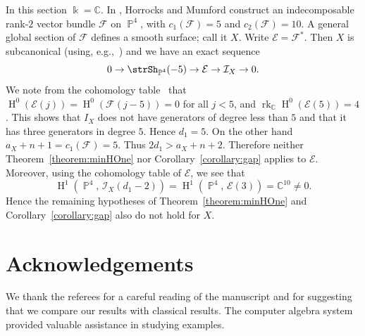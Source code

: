 \documentclass[11pt,a4paper]{amsart}
\theoremstyle{plain}
\theoremstyle{definition}
\newcommand{\calE}{\mathcal E}
\newcommand{\calF}{\mathcal F}
\newcommand{\calI}{\mathcal I}
\newcommand{\complex}{\mathbb{C}}
\DeclareMathOperator{\rank}{rk}
\DeclareMathOperator{\projective}{\mathbb{P}}
\DeclareMathOperator{\homology}{H}
\begin{document}
In this section $\Bbbk = \complex$.
In \cite{HorrocksMumfordRank21973}, Horrocks and Mumford construct an
indecomposable rank-$2$ vector bundle $\calF$ on $\projective^4$, 
with $c_1(\calF) = 5$ and $c_2(\calF) = 10$. A general global section of
$\calF$ defines a smooth surface; call it $X$. Write $\calE = \calF^*$.
Then $X$ is subcanonical (using, e.g.,~\cite[Proposition
6.1]{HartshorneVarSmallCodim1974})
and we have an exact sequence
\[
0 \to \strSh_{\projective^4}(-5) \to \calE \to \calI_X \to 0. 
\]
We note from the cohomology table~\cite[p.~74]{HorrocksMumfordRank21973}
that $\homology^0(\calE(j)) = \homology^0(\calF(j-5)) = 0$ for all $j < 5$, and
$\rank_\complex \homology^0(\calE(5)) = 4$. 
This shows that $I_X$ does not have generators of degree less than $5$ and
that it has three generators in degree $5$.
Hence $d_1 = 5$. On the other hand $a_X + n+1  = c_1(\calF) = 5$. Thus 
$2d_1 > a_X + n+2$. Therefore neither Theorem~\ref{theorem:minHOne} nor
Corollary~\ref{corollary:gap} applies to $\calE$.
Moreover, using the cohomology table of $\calE$, we see that
\[
\homology^1(\projective^4,\, \calI_X(d_1 - 2)) = 
\homology^1(\projective^4,\, \calE(3)) = \complex^{10} \neq 0.
\]
Hence the remaining hypotheses of 
Theorem~\ref{theorem:minHOne} and
Corollary~\ref{corollary:gap} also do not hold for $X$.

\section*{Acknowledgements}

We thank the referees for a careful reading of the manuscript and for
suggesting that we compare our results with classical results.
The computer algebra system~\cite{M2} 
provided valuable assistance in studying examples.
\end{document}
